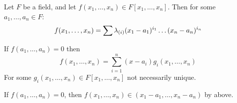 \begin{theorem}\label{theorem_8.8.5}
  Let $F$ be a field, and let $f(x_1, \dots, x_n) \in F[x_1, \dots, x_n]$.
  Then for some $a_1, \dots, a_n \in F$:
  \begin{equation*}
    f(x_1,\dots,x_n)=\sum{\lambda_{(i)}(x_1-a_1)^{i_1} \dots (x_n-a_n)^{i_n}}
  \end{equation*}
\end{theorem}
\begin{corollary}
  If $f(a_1, \dots, a_n)=0$ then
  \begin{equation*}
    f(x_1, \dots, x_n)=\sum_{i=1}^n{(x-a_i)g_i(x_1, \dots, x_n)}
  \end{equation*}
   For some $g_i(x_1, \dots, x_n) \in F[x_1, \dots, x_n]$ not
   necessarily unique.
\end{corollary}
\begin{proof.g}
  If $f(a_1, \dots, a_n)=0$, then $f(x_1, \dots, x_n) \in (x_1-a_1,
  \dots, x_n-a_n)$ by above.
\end{proof.g}
